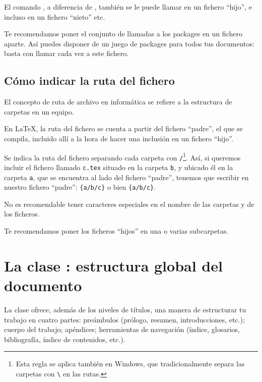 El comando , a diferencia de  , también se le puede llamar en un fichero \enquote{hijo}, e incluso en un fichero \enquote{nieto} etc.

Te recomendamos poner el conjunto de llamadas a los packages en un fichero aparte. Así puedes disponer de un juego de packages para todos tus documentos: basta con llamar cada vez a este fichero.


\subsection{Cómo indicar la ruta del fichero}\label{chemin}

El concepto de ruta de archivo en informática se refiere a la estructura de carpetas en un equipo.

En \LaTeX{}, la ruta del fichero se cuenta a partir del fichero \enquote{padre}, el que se compila, incluido allí a la hora de hacer una inclusión en un fichero \enquote{hijo}.

Se indica la ruta del fichero separando cada carpeta con \verb|/|\footnote{Esta regla se aplica también en Windows, que tradicionalmente separa las carpetas con \texttt{\textbackslash} en las rutas.}. Así, si queremos incluir el fichero llamado \verb|c.tex| situado en la carpeta \verb|b|, y ubicado él en la carpeta \verb|a|, que se encuentra al lado del fichero \enquote{padre}, tenemos que escribir en nuestro fichero \enquote{padre}: \verb|{a/b/c}|
o bien
\verb|{a/b/c}|.

\begin{attention}

No es recomendable tener caracteres especiales en el nombre de las carpetas y de los ficheros.
\end{attention}

Te recomendamos poner los ficheros \enquote{hijos} en una o varias subcarpetas.

\section{La clase : estructura global del documento}\label{sectionbook}

La clase  ofrece, además de los niveles de títulos, una manera de estructurar tu trabajo en cuatro partes: preámbulos (prólogo, resumen, introducciones, etc.); cuerpo del trabajo; apéndices; herramientas de navegación (índice, glosarios, bibliografía, índice de contenidos, etc.). 

